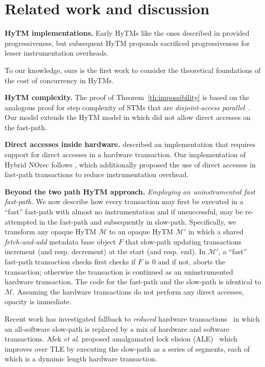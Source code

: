 \section{Related work and discussion}
\label{sec:rel}
%
\vspace{1mm}\noindent\textbf{HyTM implementations.}
Early HyTMs like the ones described in \cite{damronhytm, kumarhytm} provided progressiveness, but
subsequent HyTM proposals sacrificed progressiveness for lesser instrumentation overheads.

To our knowledge, ours is the first work to consider the theoretical foundations of the cost of concurrency in HyTMs.

\vspace{1mm}\noindent\textbf{HyTM complexity.}
The proof of Theorem~\ref{th:impossibility} is based on the analogous proof for step complexity of STMs that are \emph{disjoint-access parallel}~\cite{prog15-pact}.
Our model extends the HyTM model in \cite{hytm14disc} which did not allow direct accesses on the fast-path.

\vspace{1mm}\noindent\textbf{Direct accesses inside hardware.}
\cite{kumarhytm} described an implementation that requires support for direct accesses in a hardware transaction. 
Our implementation of Hybrid NOrec follows \cite{hynorecriegel}, which additionally proposed the use of direct accesses
in fast-path transactions to reduce instrumentation overhead. %

\vspace{1mm}\noindent\textbf{Beyond the two path HyTM approach.}
\vspace{1mm}\noindent\textit{Employing an uninstrumented fast fast-path.}
We now describe how every transaction may first be executed in a ``fast'' fast-path with almost no instrumentation
and if unsuccessful, may be re-attempted in the fast-path and subsequently in slow-path.
Specifically, we transform any opaque HyTM $\mathcal{M}$ to an opaque
HyTM $\mathcal{M}'$ in which a shared \emph{fetch-and-add} metadata base object $F$ that slow-path updating transactions
increment (and resp. decrement) at the start (and resp. end). In $\mathcal{M}'$, a ``fast'' fast-path transaction checks first checks if $F$ is $0$
and if not, aborts the transaction; otherwise the transaction is continued as an uninstrumented hardware transaction.
The code for the fast-path and the slow-path is identical to $\mathcal{M}$.
Assuming the hardware transactions do not perform any direct accesses, opacity is immediate.

Recent work has investigated fallback to \emph{reduced} hardware transactions~\cite{MS13}
in which an all-software slow-path is replaced by a mix of hardware and software transactions. 
Afek \emph{et al}. proposed amalgamated lock elision (ALE)~\cite{ale15} which improves over TLE
by executing the slow-path as a series of segments, each of which is a dynamic length hardware transaction.
